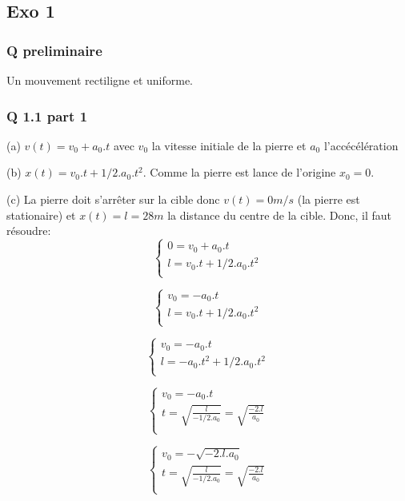 \documentclass[]{book}
\theoremstyle{definition}
\begin{document}
\subsection*{Exo 1}
\subsubsection*{Q preliminaire}
Un mouvement rectiligne et uniforme.

\subsubsection*{Q 1.1 part 1}
(a) $v(t) = v_0 + a_0.t$ avec $v_0$ la vitesse initiale de la pierre et $a_0$ l'acc\'ec\'el\'eration


(b) $x(t) = v_0.t + 1/2.a_0.t^2$. Comme la pierre est lance de l'origine $x_0 = 0$.


(c) La pierre doit s'arr\^eter sur la cible donc $v(t)=0m/s$ (la pierre est stationaire) 
et $x(t) = l = 28m$ la distance du centre de la cible. Donc, il faut r\'esoudre:
$$
\left\{ 
\begin{array}{l}
0 = v_0 + a_0.t \\
l = v_0.t + 1/2.a_0.t^2\\
\end{array}
\right. 
$$

$$
\left\{ 
\begin{array}{l}
v_0 = - a_0.t \\
l = v_0.t + 1/2.a_0.t^2\\
\end{array}
\right. 
$$

$$
\left\{ 
\begin{array}{l}
v_0 = - a_0.t \\
l = - a_0.t^2 + 1/2.a_0.t^2\\
\end{array}
\right. 
$$

$$
\left\{ 
\begin{array}{l}
v_0 = - a_0.t \\
t = \sqrt{\frac{l}{-1/2.a_0}} = \sqrt{\frac{-2.l}{a_0}}\\
\end{array}
\right. 
$$

$$
\left\{ 
\begin{array}{l}
v_0 = - \sqrt{-2.l.a_0} \\
t = \sqrt{\frac{l}{-1/2.a_0}} = \sqrt{\frac{-2.l}{a_0}}\\
\end{array}
\right. 
$$
\end{document}
